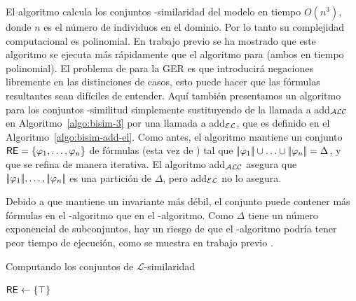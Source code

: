 El algoritmo \alc calcula los conjuntos \alc-similaridad del modelo en
tiempo $O(n^3)$, donde $ n $ es el n\'umero de individuos en el dominio. 
Por lo tanto su complejidad computacional es polinomial. En trabajo previo \cite{areces08} se ha mostrado que este algoritmo se ejecuta m\'as r\'apidamente que el algoritmo para \EL (ambos en tiempo polinomial).
El problema de \alc para la GER es que introducir\'a negaciones libremente en las distinciones de casos, esto
puede hacer que las f\'ormulas resultantes sean dif\'iciles de entender. 
Aqu\'i tambi\'en
presentamos un algoritmo para los conjuntos \el-similitud simplemente sustituyendo de la llamada a add$_{\mathcal{ALC}} $ en
Algoritmo~\ref{algo:bisim-3} por una llamada a add$_{\mathcal{EL}} $, que es
definido en el Algoritmo~\ref{algo:bisim-add-el}. Como antes, el
algoritmo mantiene un conjunto $\textsf{RE} = \{\varphi_1,\ldots,\varphi_n\}$ de
f\'ormulas (esta vez de \el) tal que $|\!|\varphi_1|\!| \cup \ldots
\cup |\!|\varphi_n|\!| = \Delta$, y que se refina de manera iterativa.
El algoritmo add$_{\mathcal{ALC}}$ asegura que
$|\!|\varphi_1|\!|,\ldots,|\!|\varphi_n|\!|$ es una partici\'on de
$ \Delta $, pero add$_{\mathcal{EL}}$ no lo asegura.

Debido a que mantiene un invariante m\'as d\'ebil, el conjunto \RE puede contener
m\'as f\'ormulas en el \el-algoritmo que en el \alc-algoritmo. Como $ \Delta $ tiene un n\'umero exponencial de subconjuntos,
hay un riesgo de que el \el-algoritmo podr\'ia tener peor tiempo de ejecuci\'on, como se muestra en trabajo previo \cite{areces08}.\\

 
\begin{algorithm}[H]
\dontprintsemicolon
\caption{Computando los conjuntos de $\mathcal{L}$-similaridad}
\label{algo:bisim-3}

$\textsf{RE} \leftarrow \{\top\}$


\end{algorithm}

